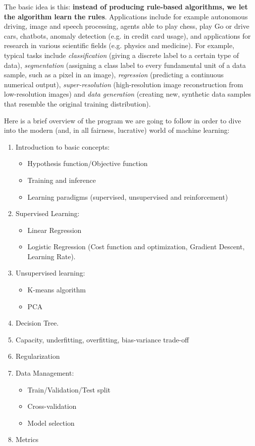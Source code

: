 The basic idea is this: \textbf{instead of producing rule-based algorithms, we let the algorithm learn the rules}. Applications include for example autonomous driving, image and speech processing, agents able to play chess, play Go or drive cars, chatbots, anomaly detection (e.g. in credit card usage), and applications for research in various scientific fields (e.g. physics and medicine). For example, typical tasks include \textit{classification} (giving a discrete label to a certain type of data), \textit{segmentation} (assigning a class label to every fundamental unit of a data sample, such as a pixel in an image), \textit{regression} (predicting a continuous numerical output), \textit{super-resolution} (high-resolution image reconstruction from low-resolution images) and \textit{data generation} (creating new, synthetic data samples that resemble the original training distribution). 


Here is a brief overview of the program we are going to follow in order to dive into the modern (and, in all fairness, lucrative) world of machine learning:
\begin{enumerate}
    \item Introduction to basic concepts: 
    \begin{itemize}
        \item[-] Hypothesis function/Objective function
        \item[-] Training and inference
        \item[-] Learning paradigms (supervised, unsupervised and reinforcement) 
    \end{itemize}
    \item Supervised Learning:
    \begin{itemize}
        \item[-] Linear Regression
        \item[-] Logistic Regression (Cost function and optimization, Gradient Descent, Learning Rate).
    \end{itemize}
    \item Unsupervised learning: 
    \begin{itemize}
        \item[-] K-means algorithm
        \item[-] PCA
    \end{itemize} 
    \item Decision Tree.
    \item Capacity, underfitting, overfitting, bias-variance trade-off
    \item Regularization
    \item Data Management: 
    \begin{itemize}
        \item[-] Train/Validation/Test split
        \item[-] Cross-validation
        \item[-] Model selection
    \end{itemize} 
    \item Metrics
\end{enumerate}

